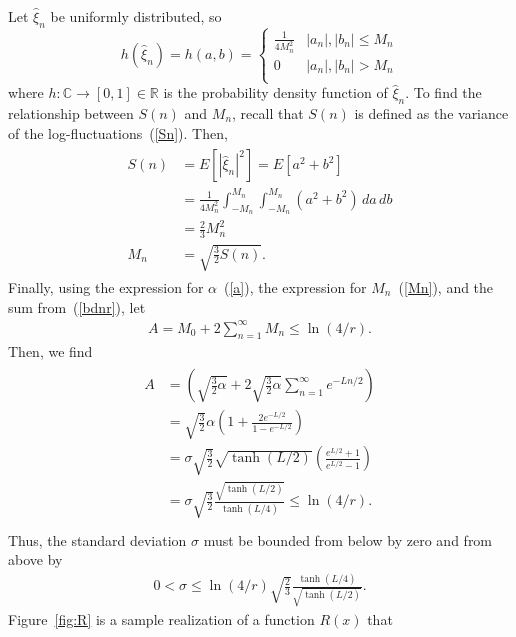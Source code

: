 Let $\hat{\xi}_n$ be uniformly distributed, so 
\begin{equation}\label{eq:square}
   h(\hat{\xi}_n) =h(a,b)= \left\{
     \begin{array}{lr}
       \frac{1}{4 M_n^2} & |a_n|,|b_n| \leq M_n\\
       0 & |a_n|,|b_n| > M_n\\
     \end{array}
   \right.
\end{equation} 
where $h:\mathbb{C}\to [0,1]\in \mathbb{R}$ is the probability density
function of $\hat{\xi}_n$. To find the relationship between $S(n)$ and
$M_n$, recall that $S(n)$ is defined as the variance of the
log-fluctuations~(\ref{Sn}). Then, 
\begin{align}
\begin{split}\label{Mn}
S(n)&=E[|\hat{\xi}_n|^2] = E[a^2+b^2]\\
 &= \frac{1}{4M_n^2}\int_{-M_n}^{M_n}\int_{-M_n}^{M_n}(a^2+b^2)\,da\,db\\
&=\frac{2}{3}M_n^2\\
M_n&=\sqrt{\frac{3}{2}S(n)}.
\end{split}
\end{align}
Finally, using the expression for $\alpha$~(\ref{a}), the
expression for $M_n$~(\ref{Mn}), and the sum from~(\ref{bdnr}), let
\begin{align*}
A = M_0+2\sum_{n=1}^\infty M_n \leq \ln(4/r).
\end{align*}
Then, we find
\begin{align*}
\begin{split}
A &=\left(\sqrt{\frac{3}{2}\alpha} +
2\sqrt{\frac{3}{2}\alpha}\sum_{n=1}^{\infty}e^{-Ln/2}\right) \\
&= \sqrt{\frac{3}{2}}\alpha\left(1+ \frac{2e^{-L/2}}{1-e^{-L/2}} \right)\\
&= \sigma\sqrt{\frac{3}{2}}
\sqrt{\tanh(L/2)}\left(\frac{e^{L/2}+1}{e^{L/2}-1} \right)\\
&= \sigma \sqrt{\frac{3}{2}}\frac{\sqrt{\tanh(L/2)}}{\tanh(L/4)} \leq \ln(4/r).\\
\end{split}
\end{align*}
Thus, the standard deviation $\sigma$ must be bounded from below by
zero and from above by
\begin{align}\label{sigma}
0<\sigma \leq \ln(4/r)\sqrt{\frac{2}{3}}\frac{\tanh(L/4)}{\sqrt{\tanh(L/2)}}.
\end{align}
Figure~\ref{fig:R} is a sample realization of a function $R(x)$ that
